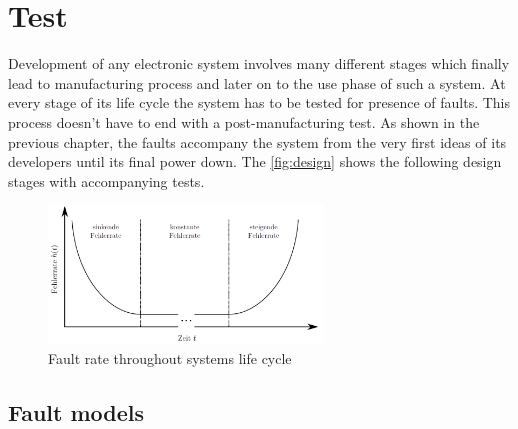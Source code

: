 \chapter{Test}
Development of any electronic system involves many different stages which finally lead to manufacturing process and later on to the use phase of such a system. At every stage of its life cycle the system has to be tested for presence of faults. This process doesn't have to end with a post-manufacturing test. As shown in the previous chapter, the faults accompany the system from the very first ideas of its developers until its final power down. The \autoref{fig:design} shows the following design stages with accompanying tests.

\begin  {figure}  [H]
\centering
\includegraphics[width=0.65\textwidth]{figures/badewanne.png}
\caption{Fault rate throughout systems life cycle~\cite{art:Avizienis}}
\label{fig:badewanne}
\end {figure}

\section{Fault models}

